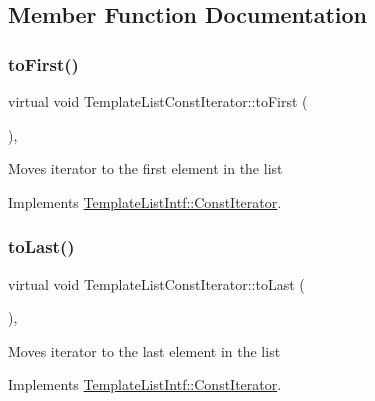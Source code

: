 \subsection{Member Function Documentation}
\mbox{\label{class_template_list_const_iterator_aa0478c27f8d663f5fb09a89b6875cec5}} 
\subsubsection{\texorpdfstring{toFirst()}{toFirst()}}
{\footnotesize\ttfamily virtual void Template\+List\+Const\+Iterator\+::to\+First (\begin{DoxyParamCaption}{ }\end{DoxyParamCaption})\hspace{0.3cm}{\ttfamily [inline]}, {\ttfamily [virtual]}}

Moves iterator to the first element in the list 

Implements \mbox{\hyperlink{class_template_list_intf_1_1_const_iterator_ab0d366c70210b05cf32f465d953d3152}{Template\+List\+Intf\+::\+Const\+Iterator}}.

\mbox{\label{class_template_list_const_iterator_abe543d04737d13d0dbdec99b4019f036}} 
\subsubsection{\texorpdfstring{toLast()}{toLast()}}
{\footnotesize\ttfamily virtual void Template\+List\+Const\+Iterator\+::to\+Last (\begin{DoxyParamCaption}{ }\end{DoxyParamCaption})\hspace{0.3cm}{\ttfamily [inline]}, {\ttfamily [virtual]}}

Moves iterator to the last element in the list 

Implements \mbox{\hyperlink{class_template_list_intf_1_1_const_iterator_acf5b37615cb4544e1b0cb5717a127900}{Template\+List\+Intf\+::\+Const\+Iterator}}.

\mbox{\label{class_template_list_const_iterator_ab7681f11844471c2522984d3e2101d24}} 

